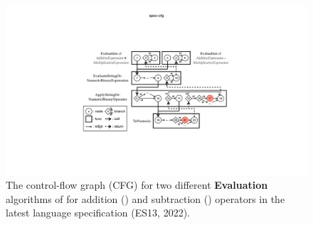 \begin{figure}
  \centering
  \includegraphics[width=\textwidth]{img/spec-cfg}
  \caption{
    The control-flow graph (CFG) for two different \textbf{Evaluation}
    algorithms of  for addition (\scode{+}) and
    subtraction (\scode{-}) operators in the latest language specification
    (ES13, 2022).
  }
  \label{fig:spec-cfg}
\end{figure}

\todo

